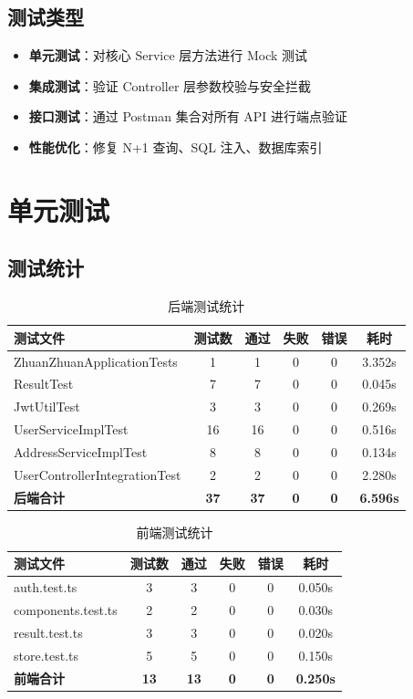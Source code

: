 \documentclass[12pt,a4paper,UTF8]{ctexart}
\begin{document}
\subsection{测试类型}
\begin{itemize}
    \item \textbf{单元测试}：对核心 Service 层方法进行 Mock 测试
    \item \textbf{集成测试}：验证 Controller 层参数校验与安全拦截
    \item \textbf{接口测试}：通过 Postman 集合对所有 API 进行端点验证
    \item \textbf{性能优化}：修复 N+1 查询、SQL 注入、数据库索引
\end{itemize}

\section{单元测试}

\subsection{测试统计}

\begin{table}[H]
\centering
\caption{后端测试统计}
\begin{tabularx}{\textwidth}{lccccc}
\toprule
\textbf{测试文件} & \textbf{测试数} & \textbf{通过} & \textbf{失败} & \textbf{错误} & \textbf{耗时} \\
\midrule
ZhuanZhuanApplicationTests & 1 & 1 & 0 & 0 & 3.352s \\
ResultTest & 7 & 7 & 0 & 0 & 0.045s \\
JwtUtilTest & 3 & 3 & 0 & 0 & 0.269s \\
UserServiceImplTest & 16 & 16 & 0 & 0 & 0.516s \\
AddressServiceImplTest & 8 & 8 & 0 & 0 & 0.134s \\
UserControllerIntegrationTest & 2 & 2 & 0 & 0 & 2.280s \\
\midrule
\textbf{后端合计} & \textbf{37} & \textbf{37} & \textbf{0} & \textbf{0} & \textbf{6.596s} \\
\bottomrule
\end{tabularx}
\end{table}

\begin{table}[H]
\centering
\caption{前端测试统计}
\begin{tabularx}{\textwidth}{lccccc}
\toprule
\textbf{测试文件} & \textbf{测试数} & \textbf{通过} & \textbf{失败} & \textbf{错误} & \textbf{耗时} \\
\midrule
auth.test.ts & 3 & 3 & 0 & 0 & 0.050s \\
components.test.ts & 2 & 2 & 0 & 0 & 0.030s \\
result.test.ts & 3 & 3 & 0 & 0 & 0.020s \\
store.test.ts & 5 & 5 & 0 & 0 & 0.150s \\
\midrule
\textbf{前端合计} & \textbf{13} & \textbf{13} & \textbf{0} & \textbf{0} & \textbf{0.250s} \\
\bottomrule
\end{tabularx}
\end{table}
\end{document}
